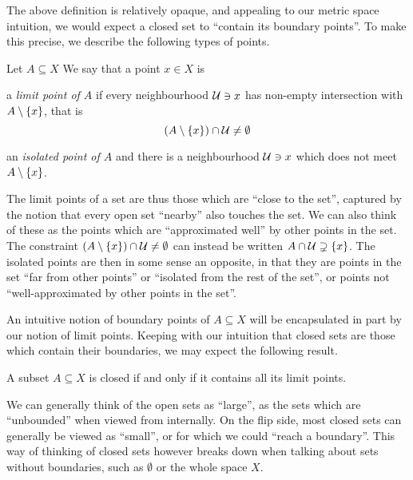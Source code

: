 \documentclass[11pt]{article}
\begin{document}
The above definition is relatively opaque, and appealing to our metric space intuition, we would expect a closed set to ``contain its boundary points''. To make this precise, we describe the following types of points.
\begin{definition}
    Let $A \subseteq X$ We say that a point $x \in X$ is
    \begin{enum}
        \item a \emph{limit point of $A$} if every neighbourhood $\mathcal{U} \ni x$ has non-empty intersection with $A \setminus \left\{  x  \right\}$, that is 
        $$
            (A \setminus \left\{  x  \right\}) \cap \mathcal{U} \neq \emptyset
        $$
        \item an \emph{isolated point of $A$} and there is a neighbourhood $\mathcal{U} \ni x$ which does not meet $A \setminus \left\{  x  \right\}$.
    \end{enum}
\end{definition}
The limit points of a set are thus those which are ``close to the set'', captured by the notion that every open set ``nearby'' also touches the set. We can also think of these as the points which are ``approximated well'' by other points in the set. The constraint $(A \setminus \left\{  x  \right\}) \cap \mathcal{U} \neq \emptyset$ can instead be written $A \cap \mathcal{U} \supsetneq \left\{  x  \right\}$. The isolated points are then in some sense an opposite, in that they are points in the set ``far from other points'' or ``isolated from the rest of the set'', or points not ``well-approximated by other points in the set''.

An intuitive notion of boundary points of $A \subseteq X$ will be encapsulated in part by our notion of limit points. Keeping with our intuition that closed sets are those which contain their boundaries, we may expect the following result.
\begin{proposition}
    A subset $A \subseteq X$ is closed if and only if it contains all its limit points.
\end{proposition}

We can generally think of the open sets as ``large'', as the sets which are ``unbounded'' when viewed from internally. On the flip side, most closed sets can generally be viewed as ``small'', or for which we could ``reach a boundary''. This way of thinking of closed sets however breaks down when talking about sets without boundaries, such as $\emptyset$ or the whole space $X$.
\end{document}
